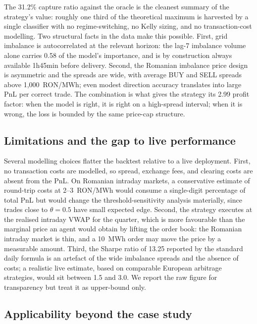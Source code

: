 \documentclass{article}
\begin{document}
The 31.2\% capture ratio against the oracle is the cleanest summary of the strategy's value: roughly one third of the theoretical maximum is harvested by a single classifier with no regime-switching, no Kelly sizing, and no transaction-cost modelling. Two structural facts in the data make this possible. First, grid imbalance is autocorrelated at the relevant horizon: the lag-7 imbalance volume alone carries 0.58 of the model's importance, and is by construction always available 1h45min before delivery. Second, the Romanian imbalance price design is asymmetric and the spreads are wide, with average BUY and SELL spreads above 1{,}000~RON/MWh; even modest direction accuracy translates into large PnL per correct trade. The combination is what gives the strategy its 2.99 profit factor: when the model is right, it is right on a high-spread interval; when it is wrong, the loss is bounded by the same price-cap structure.

\subsection{Limitations and the gap to live performance}

Several modelling choices flatter the backtest relative to a live deployment. First, no transaction costs are modelled, so spread, exchange fees, and clearing costs are absent from the PnL. On Romanian intraday markets, a conservative estimate of round-trip costs at 2--3~RON/MWh would consume a single-digit percentage of total PnL but would change the threshold-sensitivity analysis materially, since trades close to $\theta = 0.5$ have small expected edge. Second, the strategy executes at the realised intraday VWAP for the quarter, which is more favourable than the marginal price an agent would obtain by lifting the order book: the Romanian intraday market is thin, and a 10~MWh order may move the price by a measurable amount. Third, the Sharpe ratio of 13.25 reported by the standard daily formula is an artefact of the wide imbalance spreads and the absence of costs; a realistic live estimate, based on comparable European arbitrage strategies, would sit between 1.5 and 3.0. We report the raw figure for transparency but treat it as upper-bound only.

\subsection{Applicability beyond the case study}
\end{document}

